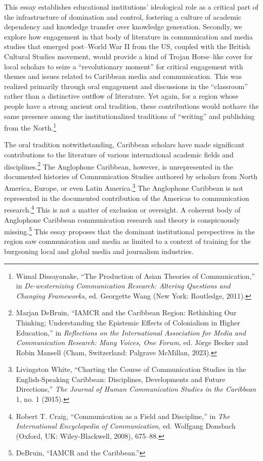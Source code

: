 \documentclass{tufte-handout}
\begin{document}
This essay establishes educational institutions' ideological role as a
critical part of the infrastructure of domination and control, fostering
a culture of academic dependency and knowledge transfer over knowledge
generation. Secondly, we explore how engagement in that body of
literature in communication and media studies that emerged post--World
War II from the US, coupled with the British Cultural Studies movement,
would provide a kind of Trojan Horse--like cover for local scholars to
seize a ``revolutionary moment'' for critical engagement with themes and
issues related to Caribbean media and communication. This was realized
primarily through oral engagement and discussions in the ``classroom''
rather than a distinctive outflow of literature. Yet again, for a region
whose people have a strong ancient oral tradition, these contributions
would not\newpage\noindent have the same presence among the institutionalized traditions
of ``writing'' and publishing from the North.\footnote{Wimal
  Dissayanake, ``The Production of Asian Theories of Communication,'' in
  \emph{De-westernizing Communication Research: Altering Questions and
  Changing Frameworks,} ed. Georgette Wang (New York: Routledge, 2011).}

The oral tradition notwithstanding, Caribbean scholars have made
significant contributions to the literature of various international
academic fields and disciplines.\footnote{Marjan DeBruin, ``IAMCR and
  the Caribbean Region: Rethinking Our Thinking; Understanding the
  Epistemic Effects of Colonialism in Higher Education,'' in
  \emph{Reflections on the International Association for Media and
  Communication Research: Many Voices, One Forum,} ed. Jörge Becker and
  Robin Mansell (Cham, Switzerland: Palgrave McMillan, 2023).} The
Anglophone Caribbean, however, is unrepresented in the documented
histories of Communication Studies authored by scholars from North
America, Europe, or even Latin America.\footnote{Livingston White,
  ``Charting the Course of Communication Studies in the English-Speaking
  Caribbean: Disciplines, Developments and Future Directions,''
  \emph{The Journal of Human Communication Studies in the Caribbean} 1,
  no. 1 (2015).} The Anglophone Caribbean is not represented in the
documented contribution of the Americas to communication
research.\footnote{Robert T. Craig, ``Communication as a Field and
  Discipline,'' in \emph{The International Encyclopedia of
  Communication}, ed. Wolfgang Donsbach (Oxford, UK: Wiley-Blackwell,
  2008), 675­--88.} This is not a matter of exclusion or oversight. A
coherent body of Anglophone Caribbean communication research and theory
is conspicuously missing.\footnote{DeBruin, ``IAMCR and the Caribbean.''}
This essay proposes that the dominant institutional perspectives in the
region saw communication and media as limited to a context of training
for the burgeoning local and global media and journalism industries.
\end{document}
